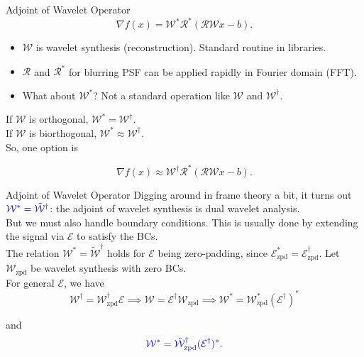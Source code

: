\documentclass[xcolor=dvipsnames,t]{beamer} %
\begin{document}
\begin{frame}{Adjoint of Wavelet Operator}
   \[ \nabla f(x) = \mathcal{W}^\ast\mathcal{R}^\ast\left(\mathcal{RW}x-b\right). \] 
   
   \begin{itemize}
      \item $\mathcal{W}$ is wavelet synthesis (reconstruction).  Standard routine in libraries.
      \item $\mathcal{R}$ and $\mathcal{R}^\ast$ for blurring PSF can be applied rapidly in Fourier domain (FFT).
      \item What about $\mathcal{W}^\ast$?  Not a standard operation like $\mathcal{W}$ and $\mathcal{W}^\dagger$.
   \end{itemize}

   If $\mathcal{W}$ is orthogonal, $\mathcal{W}^\ast = \mathcal{W}^\dagger$.\\
   If $\mathcal{W}$ is biorthogonal, $\mathcal{W}^\ast \approx \mathcal{W}^\dagger$.\\
   So, one option is

   \[ \nabla f(x) \approx \mathcal{W}^\dagger\mathcal{R}^\ast\left(\mathcal{RW}x-b\right). \]
   
\end{frame}

\begin{frame}{Adjoint of Wavelet Operator}
   Digging around in frame theory a bit, it turns out ${\color{blue} \mathcal{W}^\ast = \tilde{\mathcal{W}}^\dagger}$: {\color{blue}the adjoint of wavelet synthesis is dual wavelet analysis}.\\[1em]

   But we must also handle boundary conditions.  This is usually done by extending the signal via $\mathcal{E}$ to satisfy the BCs.\\[1em]

   The relation $\mathcal{W}^\ast = \tilde{\mathcal{W}}^\dagger$ holds for $\mathcal{E}$ being zero-padding, since $\mathcal{E}_\text{zpd}^\ast = \mathcal{E}_\text{zpd}^\dagger$.  Let $\mathcal{W}_\text{zpd}$ be wavelet synthesis with zero BCs.\\[1em]

   For general $\mathcal{E}$, we have\\[-1em]

   \[ \mathcal{W}^\dagger = \mathcal{W}_\text{zpd}^\dagger\mathcal{E} \implies \mathcal{W}=\mathcal{E}^\dagger\mathcal{W}_\text{zpd} \implies \mathcal{W}^\ast = \mathcal{W}_\text{zpd}^\ast(\mathcal{E}^\dagger)^\ast \]

   and\\[-1em]

   \[ {\color{blue} \mathcal{W}^\ast = \tilde{\mathcal{W}}_\text{zpd}^\dagger (\mathcal{E}^\dagger)^\ast}. \] 


\end{frame}
\end{document}

